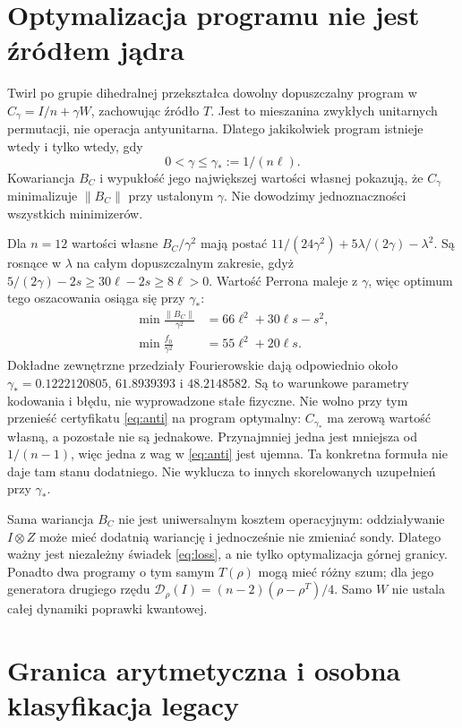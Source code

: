 \documentclass[11pt,a4paper]{article}
\begin{document}
\section{Optymalizacja programu nie jest źródłem jądra}

Twirl po grupie dihedralnej przekształca dowolny dopuszczalny program
w $C_\gamma=I/n+\gamma W$, zachowując źródło $T$.
Jest to mieszanina zwykłych unitarnych permutacji, nie operacja
antyunitarna. Dlatego jakikolwiek program istnieje wtedy i tylko wtedy,
gdy
\[
 0<\gamma\le\gamma_*:=1/(n\ell).
\]
Kowariancja $B_C$ i wypukłość jego największej wartości własnej
pokazują, że $C_\gamma$ minimalizuje $\|B_C\|$ przy ustalonym
$\gamma$. Nie dowodzimy jednoznaczności wszystkich minimizerów.

Dla $n=12$ wartości własne $B_C/\gamma^2$ mają postać
$11/(24\gamma^2)+5\lambda/(2\gamma)-\lambda^2$.
Są rosnące w $\lambda$ na całym dopuszczalnym zakresie, gdyż
$5/(2\gamma)-2s\ge30\ell-2s\ge8\ell>0$.
Wartość Perrona maleje z $\gamma$, więc optimum tego oszacowania
osiąga się przy $\gamma_*$:
\begin{align}
 \min\frac{\|B_C\|}{\gamma^2}&=66\ell^2+30\ell s-s^2,\\
 \min\frac{f_0}{\gamma^2}&=55\ell^2+20\ell s.
\end{align}
Dokładne zewnętrzne przedziały Fourierowskie dają odpowiednio około
$\gamma_*=0.1222120805$, $61.8939393$ i $48.2148582$.
Są to warunkowe parametry kodowania i błędu, nie wyprowadzone stałe fizyczne.
Nie wolno przy tym przenieść certyfikatu \eqref{eq:anti} na program
optymalny: $C_{\gamma_*}$ ma zerową wartość własną, a pozostałe nie
są jednakowe. Przynajmniej jedna jest mniejsza od $1/(n-1)$,
więc jedna z wag w \eqref{eq:anti} jest ujemna. Ta konkretna formuła
nie daje tam stanu dodatniego. Nie wyklucza to innych skorelowanych
uzupełnień przy $\gamma_*$.

Sama wariancja $B_C$ nie jest uniwersalnym kosztem operacyjnym:
oddziaływanie $I\otimes Z$ może mieć dodatnią wariancję i jednocześnie
nie zmieniać sondy. Dlatego ważny jest niezależny świadek
\eqref{eq:loss}, a nie tylko optymalizacja górnej granicy.
Ponadto dwa programy o tym samym $T(\rho)$ mogą mieć różny szum;
dla jego generatora drugiego rzędu
$\mathcal D_\rho(I)=(n-2)(\rho-\rho^T)/4$.
Samo $W$ nie ustala całej dynamiki poprawki kwantowej.

\section{Granica arytmetyczna i osobna klasyfikacja legacy}
\end{document}
